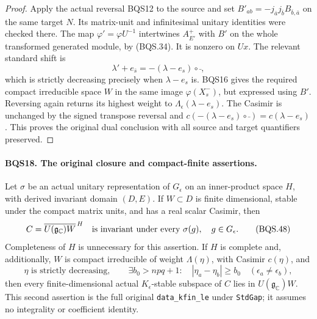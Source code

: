 \documentclass[11pt,a4paper]{article}
\numberwithin{equation}{section}
\theoremstyle{remark}\newtheorem{remark}[theorem]{Remark}
\begin{document}
\begin{proof}
Apply the actual reversal BQS12 to the source and set
$B'_{ab}=-j_{\bar a}j_{\bar b}B_{\bar b,\bar a}$ on the same target
$N$.  Its matrix-unit and infinitesimal unitary identities were checked
there.  The map
$\varphi'=\varphi U^{-1}$ intertwines $A^+_{E'}$ with $B'$ on
the whole transformed generated module, by (BQS.34).
It is nonzero on $Ux$.
The relevant standard shift is
\[
            \lambda'+e_{\bar s}
                     =-(\lambda-e_s)\circ\bar{\ },
 \tag{BQS.47}
\]
which is strictly decreasing precisely when $\lambda-e_s$ is.
BQS16 gives the required compact irreducible space $W$ in the same
image $\varphi(X_s^-)$, but expressed using $B'$.
Reversing again returns its highest weight to
$\Lambda_\epsilon(\lambda-e_s)$.
The Casimir is unchanged by the signed transpose reversal and
$c(-(\lambda-e_s)\circ\bar{\ })=c(\lambda-e_s)$.
This proves the original dual conclusion with all source and target
quantifiers preserved.
\end{proof}

\paragraph{BQS18. The original closure and compact-finite assertions.}
\label{claim:BQS18}
Let $\sigma$ be an actual unitary representation of $G_\epsilon$ on
an inner-product space $H$, with derived invariant domain $(D,E)$.
If $W\subset D$ is finite dimensional, stable under the compact
matrix units, and has a real scalar Casimir, then
\[
 C=\overline{U(\mathfrak g_{\mathbb C})W}^{\,H}
                 \quad\hbox{is invariant under every }\sigma(g),
                 \quad g\in G_\epsilon .
 \tag{BQS.48}
\]
Completeness of $H$ is unnecessary for this assertion.
If $H$ is complete and, additionally, $W$ is compact irreducible
of weight $\Lambda(\eta)$, with Casimir $c(\eta)$, and
\[
 \eta\text{ is strictly decreasing},\qquad
 \exists b_0>npq+1:\quad
 |\eta_a-\eta_b|\ge b_0\quad(\epsilon_a\ne\epsilon_b),
 \tag{BQS.49}
\]
then every
finite-dimensional actual $K_\epsilon$-stable subspace of $C$
lies in $U(\mathfrak g_{\mathbb C})W$.
This second assertion is the full original \texttt{data\_\allowbreak kfin\_\allowbreak le}
under \texttt{Std\allowbreak Gap}; it assumes no integrality or coefficient identity.
\end{document}
